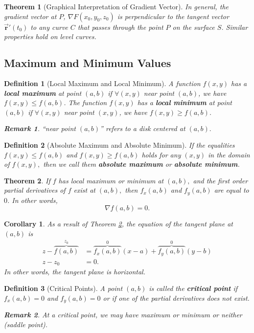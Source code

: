 \documentclass[12pt,a4paper]{article}
\newtheorem{thm}{Theorem}[subsection]
\newtheorem{df}{Definition}[subsection]
\newtheorem{cor}{Corollary}[section]
\newtheorem*{rmk}{\indent Remark}
\def\vecr{\vec{\boldsymbol{\textbf{r}}}}
\begin{document}
\begin{thm}[Graphical Interpretation of Gradient Vector]
	In general, the gradient vector at $P$, $\nabla F(x_0,y_0,z_0)$ is perpendicular to the tangent vector $\vecr'(t_0)$ to any curve $C$ that passes through the point $P$ on the surface $S$. Similar properties hold on level curves. 
\end{thm}

\subsection{Maximum and Minimum Values}
\begin{df}[Local Maximum and Local Minimum]
	A function $f(x,y)$ has a \textbf{local maximum} at point $(a,b)$ if $\forall(x,y)$ near point $(a,b)$, we have $f(x,y)\leq f(a,b)$. The function $f(x,y)$ has a \textbf{local minimum} at point $(a,b)$ if $\forall (x,y)$ near point $(x,y)$, we have $f(x,y)\geq f(a,b)$.
	\begin{rmk} ``near point $(a,b)$'' refers to a disk centered at $(a,b).$ \end{rmk}
\end{df}
\begin{df}[Absolute Maximum and Absolute Minimum]
	If the equalities $f(x,y)\leq f(a,b)$ and $f(x,y)\geq f(a,b)$ holds for any $(x,y)$ in the domain of $f(x,y),$ then we call them \textbf{absolute maximum} or \textbf{absolute minimum}.	
\end{df}
\begin{thm}\label{thm3.7.1}
	If $f$ has local maximum or minimum at $(a,b),$ and the first order partial derivatives of $f$ exist at $(a,b),$ then $f_x(a,b)$ and $f_y(a,b)$ are equal to $0$. In other words, \[\nabla f(a,b)=0.\]	
\end{thm}
\begin{cor}
	As a result of Theorem \ref{thm3.7.1}, the equation of the tangent plane at $(a,b)$ is \[\begin{aligned}z-\overbrace{f(a,b)}^{z_0}&=\overbrace{f_x(a,b)}^{0}(x-a)+\overbrace{f_y(a,b)}^{0}(y-b)\\z-z_0&=0.\end{aligned}\] In other words, the tangent plane is horizontal. 
\end{cor}
\begin{df}[Critical Points]
	A point $(a,b)$ is called the \textbf{critical point} if $f_x(a,b)=0$ and $f_y(a,b)=0$ or if one of the partial derivatives does not exist. 
	\begin{rmk} At a critical point, we may have maximum or minimum or neither (saddle point). \end{rmk}	
\end{df}
\end{document}
